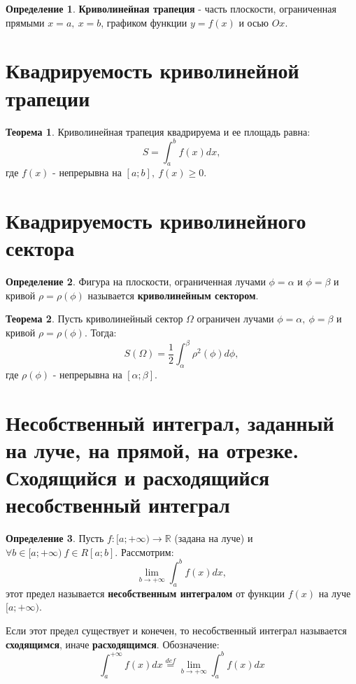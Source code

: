 \documentclass{report}
\theoremstyle{definition}
\newtheorem*{definition}{Определение}
\newtheorem*{theorem}{Теорема}
\begin{document}
\begin{definition}
    \textbf{Криволинейная трапеция} - часть плоскости, ограниченная прямыми $x=a, \ x=b$, графиком функции
    $y = f(x)$ и осью $Ox$.
\end{definition}

\section{Квадрируемость криволинейной трапеции}

\begin{theorem}
    Криволинейная трапеция квадрируема и ее площадь равна:
    \begin{equation*}
        S = \int_{a}^{b}f(x)dx,
    \end{equation*}
    где $f(x)$ - непрерывна на $[a;b], \ f(x) \geqslant 0$.
\end{theorem}

\section{Квадрируемость криволинейного сектора}

\begin{definition}
    Фигура на плоскости, ограниченная лучами $\phi = \alpha$ и $\phi = \beta$ и кривой $\rho = \rho(\phi)$
    называется \textbf{криволинейным сектором}.
\end{definition}

\begin{theorem}
    Пусть криволинейный сектор $\Omega$ ограничен лучами $\phi = \alpha, \ \phi = \beta$ и кривой $\rho
        = \rho(\phi)$. Тогда:
    \begin{equation*}
        S(\Omega) = \frac{1}{2}\int_{\alpha}^{\beta}\rho^2(\phi)d\phi,
    \end{equation*}
    где $\rho(\phi)$ - непрерывна на $[\alpha;\beta]$.
\end{theorem}

\section{Несобственный интеграл, заданный на луче, на прямой, на отрезке.
  Сходящийся и расходящийся несобственный интеграл}

\begin{definition}
    Пусть $f:[a;+\infty)\rightarrow\mathbb{R}$ (задана на луче) и $\forall b \in [a;+\infty) \ f\in R[a;b]$.
    Рассмотрим:
    \begin{equation*}
        \underset{b\rightarrow+\infty}{\lim}\int_{a}^{b}f(x)dx,
    \end{equation*}
    этот предел называется \textbf{несобственным интегралом} от функции $f(x)$ на луче $[a;+\infty)$.

    Если этот предел существует и конечен, то несобственный интеграл называется \textbf{сходящимся}, иначе
    \textbf{расходящимся}. Обозначение:
    \begin{equation*}
        \int_{a}^{+\infty}f(x)dx \overset{def}{=}\underset{b\rightarrow+\infty}{\lim}\int_{a}^{b}f(x)dx
    \end{equation*}
\end{definition}
\end{document}
